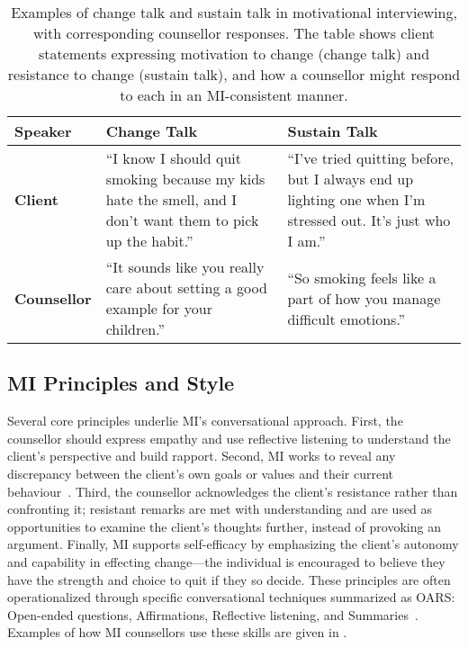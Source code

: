 \begin{table}[ht!]
	\centering
	\begin{tabular}{@{} p{} p{} p{} @{}}
		\toprule
		\textbf{Speaker}                                                                                             & \textbf{Change Talk} & \textbf{Sustain Talk} \\
		\midrule
		\textbf{Client}                                                                                              &
		``I know I should quit smoking because my kids hate the smell, and I don't want them to pick up the habit.'' &
		``I've tried quitting before, but I always end up lighting one when I'm stressed out. It's just who I am.''                                                 \\
		\addlinespace
		\textbf{Counsellor}                                                                                          &
		``It sounds like you really care about setting a good example for your children.''                           &
		``So smoking feels like a part of how you manage difficult emotions.''                                                                                      \\
		\bottomrule
	\end{tabular}
	\caption[Examples of change talk and sustain talk]{Examples of change talk and sustain talk in motivational interviewing, with corresponding counsellor responses. The table shows client statements expressing motivation to change (change talk) and resistance to change (sustain talk), and how a counsellor might respond to each in an MI-consistent manner.}
	\label{tab:change_sustain_talk}
\end{table}



\subsection*{MI Principles and Style}
Several core principles underlie MI's conversational approach. First, the counsellor should express empathy and use reflective listening to understand the client's perspective and build rapport. Second, MI works to reveal any discrepancy between the client's own goals or values and their current behaviour~\cite{Miller_2023}. Third, the counsellor acknowledges the client's resistance rather than confronting it; resistant remarks are met with understanding and are used as opportunities to examine the client's thoughts further, instead of provoking an argument. Finally, MI supports self-efficacy by emphasizing the client's autonomy and capability in effecting change---the individual is encouraged to believe they have the strength and choice to quit if they so decide. These principles are often operationalized through specific conversational techniques summarized as OARS: Open-ended questions, Affirmations, Reflective listening, and Summaries~\cite{Rollnick1995}. Examples of how MI counsellors use these skills are given in .


